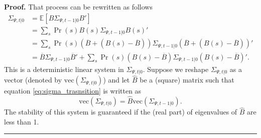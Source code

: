 \documentclass[thmsb,11pt]{article}
\newenvironment{proof}[1][Proof]{\noindent \textbf{#1.} }{\  \rule{0.5em}{0.5em}}
\begin{document}
\begin{appendix}
\begin{proof}
	That process can be rewritten as follows
	\begin{align}
		\Sigma_{\Psi,t|0} &= \mathbb{E}[B \Sigma_{\Psi,t-1|0} B']\\
				    &=\sum_s \Pr(s) B(s) \Sigma_{\Psi,t-1|0} B(s)'\\
				   &=\sum_s \Pr(s) (\overline B+(B(s)-\overline B))\Sigma_{\Psi,t-1|0}(\overline B+(B(s)-\overline B))'\\
				  &=\overline B \Sigma_{\Psi,t-1|0}\overline B' +\sum_s\Pr(s) (B(s)-\overline B)\Sigma_{\Psi,t-1|0}(B(s)-\overline B)'.\label{eq:sigma_trasnsition}
	\end{align}
% 	
 	This is a deterministic linear system in $\Sigma_{\Psi,t|0}$. Suppose we reshape $\Sigma_{\Psi,t|0}$  as a vector (denoted by $\text{vec}(\Sigma_{\Psi,t|0})$) and let $\hat{B}$ be a (square) matrix such that equation \ref{eq:sigma_trasnsition} is written as
% 	
 \[\text{vec}(\Sigma_{\Psi,t|0})=\hat{B}\text{vec}( \Sigma_{\Psi,t-1|0}).\]	
%
 The stability of this system is guaranteed if the (real part) of eigenvalues of $\hat{B}$ are less than 1.
 \end{proof}

\end{appendix}

\smallskip \ \pagebreak

\smallskip



\end{document}
